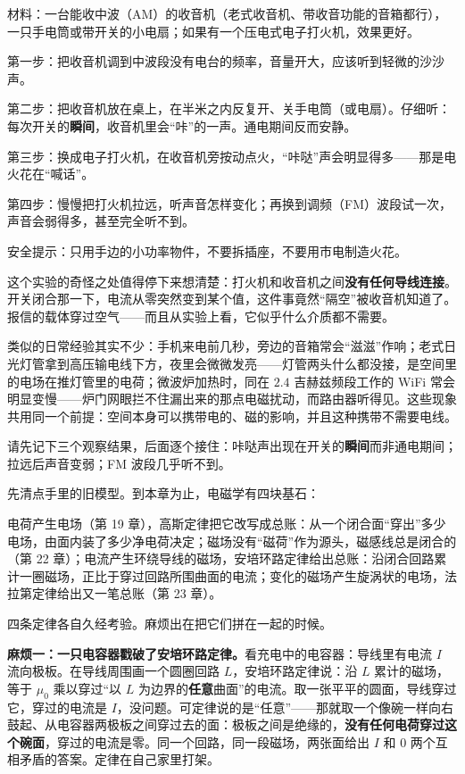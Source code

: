 
\begin{experiment}[用收音机听电的“喷嚏”]
材料：一台能收中波（AM）的收音机（老式收音机、带收音功能的音箱都行），一只手电筒或带开关的小电扇；如果有一个压电式电子打火机，效果更好。

第一步：把收音机调到中波段没有电台的频率，音量开大，应该听到轻微的沙沙声。

第二步：把收音机放在桌上，在半米之内反复开、关手电筒（或电扇）。仔细听：每次开关的\textbf{瞬间}，收音机里会“咔”的一声。通电期间反而安静。

第三步：换成电子打火机，在收音机旁按动点火，“咔哒”声会明显得多——那是电火花在“喊话”。

第四步：慢慢把打火机拉远，听声音怎样变化；再换到调频（FM）波段试一次，声音会弱得多，甚至完全听不到。

安全提示：只用手边的小功率物件，不要拆插座，不要用市电制造火花。
\end{experiment}

这个实验的奇怪之处值得停下来想清楚：打火机和收音机之间\textbf{没有任何导线连接}。开关闭合那一下，电流从零突然变到某个值，这件事竟然“隔空”被收音机知道了。报信的载体穿过空气——而且从实验上看，它似乎什么介质都不需要。

类似的日常经验其实不少：手机来电前几秒，旁边的音箱常会“滋滋”作响；老式日光灯管拿到高压输电线下方，夜里会微微发亮——灯管两头什么都没接，是空间里的电场在推灯管里的电荷；微波炉加热时，同在 \(2.4\) 吉赫兹频段工作的 WiFi 常会明显变慢——炉门网眼拦不住漏出来的那点电磁扰动，而路由器听得见。这些现象共用同一个前提：空间本身可以携带电的、磁的影响，并且这种携带不需要电线。

请先记下三个观察结果，后面逐个接住：咔哒声出现在开关的\textbf{瞬间}而非通电期间；拉远后声音变弱；FM 波段几乎听不到。


先清点手里的旧模型。到本章为止，电磁学有四块基石：

电荷产生电场（第 19 章），高斯定律把它改写成总账：从一个闭合面“穿出”多少电场，由面内装了多少净电荷决定；磁场没有“磁荷”作为源头，磁感线总是闭合的（第 22 章）；电流产生环绕导线的磁场，安培环路定律给出总账：沿闭合回路累计一圈磁场，正比于穿过回路所围曲面的电流；变化的磁场产生旋涡状的电场，法拉第定律给出又一笔总账（第 23 章）。

四条定律各自久经考验。麻烦出在把它们拼在一起的时候。

\textbf{麻烦一：一只电容器戳破了安培环路定律。}看充电中的电容器：导线里有电流 \(I\) 流向极板。在导线周围画一个圆圈回路 \(L\)，安培环路定律说：沿 \(L\) 累计的磁场，等于 \(\mu_0\) 乘以穿过“以 \(L\) 为边界的\textbf{任意}曲面”的电流。取一张平平的圆面，导线穿过它，穿过的电流是 \(I\)，没问题。可定律说的是“任意”——那就取一个像碗一样向右鼓起、从电容器两极板之间穿过去的面：极板之间是绝缘的，\textbf{没有任何电荷穿过这个碗面}，穿过的电流是零。同一个回路，同一段磁场，两张面给出 \(I\) 和 \(0\) 两个互相矛盾的答案。定律在自己家里打架。

